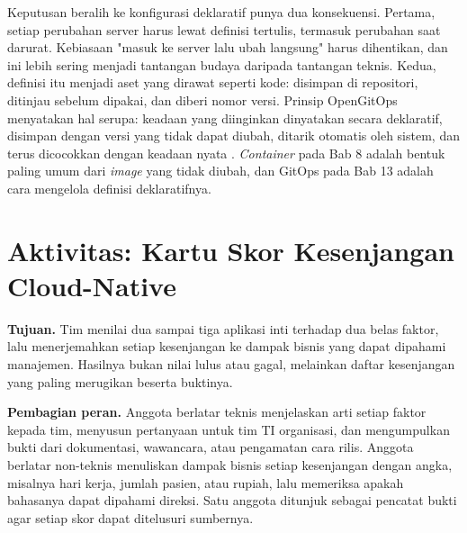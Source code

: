 Keputusan beralih ke konfigurasi deklaratif punya dua konsekuensi. Pertama, setiap perubahan
server harus lewat definisi tertulis, termasuk perubahan saat darurat. Kebiasaan "masuk ke
server lalu ubah langsung" harus dihentikan, dan ini lebih sering menjadi tantangan budaya
daripada tantangan teknis. Kedua, definisi itu menjadi aset yang dirawat seperti kode:
disimpan di repositori, ditinjau sebelum dipakai, dan diberi nomor versi. Prinsip OpenGitOps
menyatakan hal serupa: keadaan yang diinginkan dinyatakan secara deklaratif, disimpan dengan
versi yang tidak dapat diubah, ditarik otomatis oleh sistem, dan terus dicocokkan dengan
keadaan nyata \cite{opengitops}. \textit{Container} pada Bab 8 adalah bentuk paling umum
dari \textit{image} yang tidak diubah, dan GitOps pada Bab 13 adalah cara mengelola
definisi deklaratifnya.

\section{Aktivitas: Kartu Skor Kesenjangan Cloud-Native}
\label{sec:ch05-aktivitas}

\textbf{Tujuan.} Tim menilai dua sampai tiga aplikasi inti terhadap dua belas faktor, lalu
menerjemahkan setiap kesenjangan ke dampak bisnis yang dapat dipahami manajemen. Hasilnya
bukan nilai lulus atau gagal, melainkan daftar kesenjangan yang paling merugikan beserta
buktinya.

\textbf{Pembagian peran.} Anggota berlatar teknis menjelaskan arti setiap faktor kepada
tim, menyusun pertanyaan untuk tim TI organisasi, dan mengumpulkan bukti dari dokumentasi,
wawancara, atau pengamatan cara rilis. Anggota berlatar non-teknis menuliskan dampak bisnis
setiap kesenjangan dengan angka, misalnya hari kerja, jumlah pasien, atau rupiah, lalu
memeriksa apakah bahasanya dapat dipahami direksi. Satu anggota ditunjuk sebagai pencatat
bukti agar setiap skor dapat ditelusuri sumbernya.

